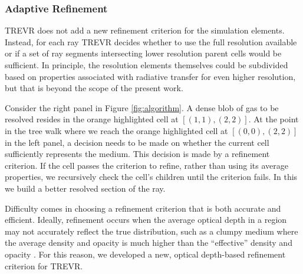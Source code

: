 \documentclass[fleq,usenatbib]{mnras}
\newcommand{\acro}{TREVR}
\begin{document}
{\subsubsection{Adaptive Refinement}\label{sec:adref}

\acro{} does not add a new refinement criterion for the simulation elements.
Instead, for each ray \acro{} decides whether to use the full resolution available or
if a set of ray segments intersecting lower resolution parent cells would be sufficient.
In principle, the resolution elements themselves could be subdivided based
on properties associated with radiative transfer for even higher resolution,
but that is beyond the scope of the present work.

Consider the right panel in Figure \ref{fig:algorithm}. A dense blob of gas 
to be resolved resides in the orange highlighted cell at $[(1,1),(2,2)]$. At 
the point in the tree walk where we reach the orange highlighted cell at 
$[(0,0),(2,2)]$ in the left panel, a decision needs to be made on whether the 
current cell sufficiently represents the medium. This decision is made by a 
refinement criterion. If the cell passes the criterion to refine, rather than 
using its average properties, we recursively check the cell's children until 
the criterion fails. In this we build a better resolved section of the ray. 

Difficulty comes in choosing a refinement criterion that is both accurate and 
efficient. Ideally, refinement occurs when the average optical depth 
in a region may not accurately reflect the true distribution, such as a clumpy 
medium where the average density and opacity is much higher than the 
``effective'' density and opacity \citep{varosiDwek99, hegmanKegel03}. For 
this reason, we developed a new, optical depth-based refinement criterion 
for \acro{}.

}
\end{document}

